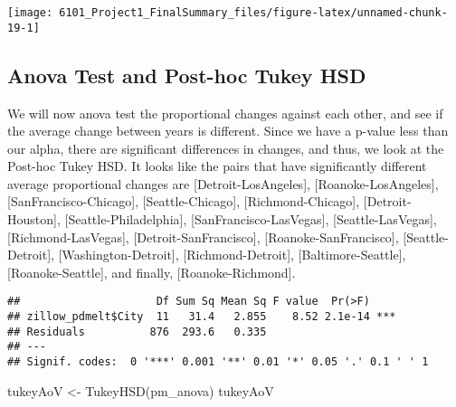 \documentclass[
]{article}
\newenvironment{Shaded}{\begin{snugshade}}{\end{snugshade}}
\newcommand{\FunctionTok}[1]{\textcolor[rgb]{0.00,0.00,0.00}{#1}}
\newcommand{\NormalTok}[1]{#1}
\newcommand{\OtherTok}[1]{\textcolor[rgb]{0.56,0.35,0.01}{#1}}
\newcommand{\SpecialCharTok}[1]{\textcolor[rgb]{0.00,0.00,0.00}{#1}}
\begin{document}
\begin{center}\texttt{[image: 6101\_Project1\_FinalSummary\_files/figure-latex/unnamed-chunk-19-1]} \end{center}

\hypertarget{anova-test-and-post-hoc-tukey-hsd}{%
\subsection{Anova Test and Post-hoc Tukey
HSD}\label{anova-test-and-post-hoc-tukey-hsd}}

We will now anova test the proportional changes against each other, and
see if the average change between years is different. Since we have a
p-value less than our alpha, there are significant differences in
changes, and thus, we look at the Post-hoc Tukey HSD. It looks like the
pairs that have significantly different average proportional changes are
{[}Detroit-LosAngeles{]}, {[}Roanoke-LosAngeles{]},
{[}SanFrancisco-Chicago{]}, {[}Seattle-Chicago{]},
{[}Richmond-Chicago{]}, {[}Detroit-Houston{]},
{[}Seattle-Philadelphia{]}, {[}SanFrancisco-LasVegas{]},
{[}Seattle-LasVegas{]}, {[}Richmond-LasVegas{]},
{[}Detroit-SanFrancisco{]}, {[}Roanoke-SanFrancisco{]},
{[}Seattle-Detroit{]}, {[}Washington-Detroit{]}, {[}Richmond-Detroit{]},
{[}Baltimore-Seattle{]}, {[}Roanoke-Seattle{]}, and finally,
{[}Roanoke-Richmond{]}.

\begin{Shaded}
\end{Shaded}

\begin{verbatim}
##                     Df Sum Sq Mean Sq F value  Pr(>F)    
## zillow_pdmelt$City  11   31.4   2.855    8.52 2.1e-14 ***
## Residuals          876  293.6   0.335                    
## ---
## Signif. codes:  0 '***' 0.001 '**' 0.01 '*' 0.05 '.' 0.1 ' ' 1
\end{verbatim}

\begin{Shaded}
\begin{Highlighting}[]
\NormalTok{tukeyAoV }\OtherTok{\textless{}{-}} \FunctionTok{TukeyHSD}\NormalTok{(pm\_anova)}
\NormalTok{tukeyAoV}
\end{Highlighting}
\end{Shaded}
\end{document}
